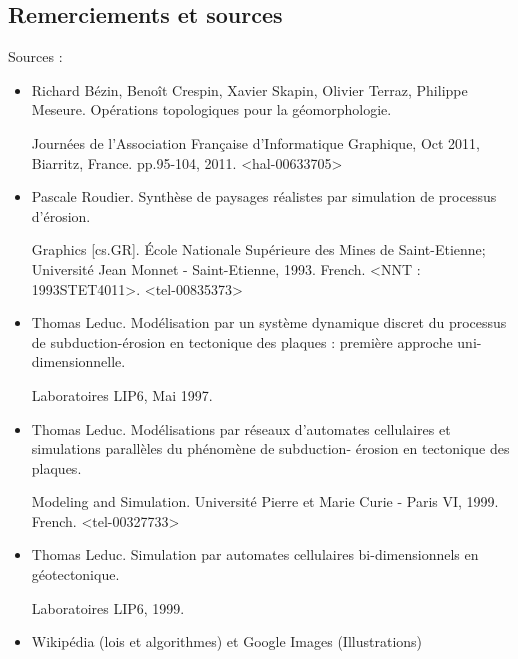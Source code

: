 \documentclass{beamer}
\begin{document}
\subsection{Remerciements et sources}
\begin{frame}
  Sources :
  \begin{footnotesize}
  \begin{itemize}
   \item Richard Bézin, Benoît Crespin, Xavier Skapin, Olivier Terraz, Philippe Meseure. Opérations
topologiques pour la géomorphologie.
    \begin{tiny} 
     Journées de l’Association Française d’Informatique Graphique, Oct 2011, Biarritz, France. pp.95-104, 2011. <hal-00633705>
    \end{tiny}
   \item Pascale Roudier. Synthèse de paysages réalistes par simulation de processus d’érosion. 
    \begin{tiny}
    Graphics
[cs.GR]. École Nationale Supérieure des Mines de Saint-Etienne; Université Jean Monnet -
Saint-Etienne, 1993. French. <NNT : 1993STET4011>. <tel-00835373>
	\end{tiny}
   \item Thomas Leduc. Modélisation par un système dynamique discret du processus de subduction-érosion en tectonique des plaques : première approche uni-dimensionnelle. 
    \begin{tiny}
    Laboratoires LIP6, Mai 1997.
    \end{tiny}
   \item Thomas Leduc. Modélisations par réseaux d’automates cellulaires et simulations parallèles
du phénomène de subduction- érosion en tectonique des plaques. 
     \begin{tiny}
     Modeling and Simulation.
Université Pierre et Marie Curie - Paris VI, 1999. French. <tel-00327733>
	 \end{tiny}
   \item Thomas Leduc. Simulation par automates cellulaires bi-dimensionnels en géotectonique. 
     \begin{tiny}
     Laboratoires LIP6, 1999.
     \end{tiny}
   \item Wikipédia (lois et algorithmes) et Google Images (Illustrations)
  \end{itemize}
  \end{footnotesize}
\end{frame}
\end{document}
